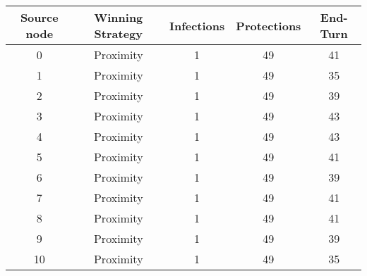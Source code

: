 \documentclass[results.tex]{subfiles}
\begin{document}
    \begin{center}
        \begin{tabular}{| c || c | c | c | c |}
            \hline
            {\bfseries Source node} & {\bfseries Winning Strategy} & {\bfseries Infections} & {\bfseries Protections}
            & {\bfseries End-Turn}
            \\  %
            \hline\hline
            0                       & Proximity                    & 1                      & 49                      & 41                   \\
            \hline
            1                       & Proximity                    & 1                      & 49                      & 35                   \\
            \hline
            2                       & Proximity                    & 1                      & 49                      & 39                   \\
            \hline
            3                       & Proximity                    & 1                      & 49                      & 43                   \\
            \hline
            4                       & Proximity                    & 1                      & 49                      & 43                   \\
            \hline
            5                       & Proximity                    & 1                      & 49                      & 41                   \\
            \hline
            6                       & Proximity                    & 1                      & 49                      & 39                   \\
            \hline
            7                       & Proximity                    & 1                      & 49                      & 41                   \\
            \hline
            8                       & Proximity                    & 1                      & 49                      & 41                   \\
            \hline
            9                       & Proximity                    & 1                      & 49                      & 39                   \\
            \hline
            10                      & Proximity                    & 1                      & 49                      & 35                   \\

\end{tabular}
\end{center}
\end{document}
